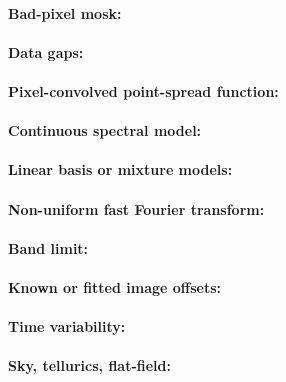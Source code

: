 \documentclass[11pt]{article}
\begin{document}
\paragraph{Bad-pixel mosk:}

\paragraph{Data gaps:}

\paragraph{Pixel-convolved point-spread function:}

\paragraph{Continuous spectral model:}

\paragraph{Linear basis or mixture models:}

\paragraph{Non-uniform fast Fourier transform:}

\paragraph{Band limit:}

\paragraph{Known or fitted image offsets:}

\paragraph{Time variability:}

\paragraph{Sky, tellurics, flat-field:}
\end{document}
